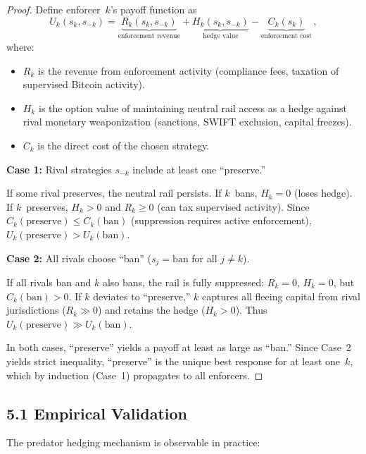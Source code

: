\documentclass[12pt]{article}
\theoremstyle{definition}
\theoremstyle{remark}
\begin{document}
\begin{proof}
Define enforcer~$k$'s payoff function as
\begin{equation}\label{eq:payoff}
  U_k(s_k, s_{-k}) = \underbrace{R_k(s_k, s_{-k})}_{\text{enforcement revenue}}
    + \underbrace{H_k(s_k, s_{-k})}_{\text{hedge value}}
    - \underbrace{C_k(s_k)}_{\text{enforcement cost}} \,,
\end{equation}
where:
\begin{itemize}
  \item $R_k$ is the revenue from enforcement activity (compliance fees,
    taxation of supervised Bitcoin activity).
  \item $H_k$ is the option value of maintaining neutral rail access as
    a hedge against rival monetary weaponization (sanctions, SWIFT
    exclusion, capital freezes).
  \item $C_k$ is the direct cost of the chosen strategy.
\end{itemize}

\medskip\noindent
\textbf{Case 1:} Rival strategies $s_{-k}$ include at least one
``preserve.''

If some rival preserves, the neutral rail persists. If $k$~bans,
$H_k = 0$ (loses hedge). If $k$~preserves, $H_k > 0$ and $R_k \geq 0$
(can tax supervised activity). Since $C_k(\text{preserve}) \leq
C_k(\text{ban})$ (suppression requires active enforcement),
$U_k(\text{preserve}) > U_k(\text{ban})$.

\medskip\noindent
\textbf{Case 2:} All rivals choose ``ban'' ($s_j = \text{ban}$ for all
$j \neq k$).

If all rivals ban and $k$ also bans, the rail is fully suppressed:
$R_k = 0$, $H_k = 0$, but $C_k(\text{ban}) > 0$. If $k$ deviates to
``preserve,'' $k$ captures all fleeing capital from rival jurisdictions
($R_k \gg 0$) and retains the hedge ($H_k > 0$). Thus
$U_k(\text{preserve}) \gg U_k(\text{ban})$.

\medskip
In both cases, ``preserve'' yields a payoff at least as large as
``ban.'' Since Case~2 yields strict inequality, ``preserve'' is the
unique best response for at least one~$k$, which by induction
(Case~1) propagates to all enforcers.
\end{proof}

\subsection{5.1 Empirical Validation}

The predator hedging mechanism is observable in practice:
\end{document}
